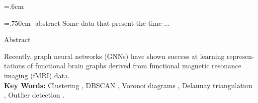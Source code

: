 \baselineskip=.6cm
\begin{latin}
\latinfield{}
\latinkeywords{ }

\newpage
\thispagestyle{empty}
\baselineskip=.750cm
\en-abstract{%
Some data that present the time ...
}


\noindent
\begin{large}
\begin{center}
Abstract
\end{center}
\end{large}
%

Recently, graph neural networks (GNNs) have shown success at learning representations of functional brain graphs derived from functional magnetic resonance imaging (fMRI) data. 
\\
\newline
{{\bf Key Words:}} Clustering , DBSCAN , Voronoi diagrams , Delaunay triangulation , Outlier detection .%
\newpage
\latinvtitle
%
\end{latin}
